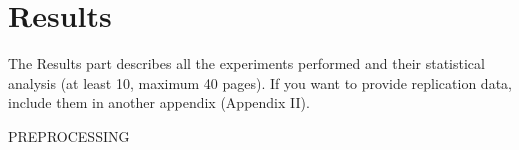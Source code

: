\graphicspath{{chapters/05_results/}}
\chapter{Results}

The Results part describes all the experiments performed and their statistical analysis (at
least 10, maximum 40 pages). If you want to provide replication data, include them in another
appendix (Appendix II).

PREPROCESSING 